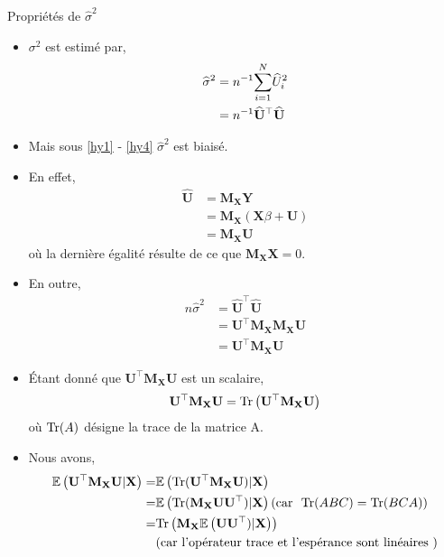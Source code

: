 \begin{frame}[allowframebreaks]{Propriétés de $\widehat{\sigma}^2$}
\begin{itemize}
\item $\sigma^2$ est estimé par,
\begin{align*}
\widehat{\sigma}^2
&= n^{-1}\underset{i=1}{\overset{N}{\sum}} \widehat{U}_i^2\\
& =  n^{-1}\widehat{\mathbf{U}}^\top\widehat{\mathbf{U}}
\end{align*}
\item Mais sous \ref{hy1} - \ref{hy4} $\widehat{\sigma}^2$ est  biaisé. 
\item En effet,
\begin{align*}
\widehat{\mathbf{U}} &= \mathbf{M}_\mathbf{X}\mathbf{Y}\\
& = \mathbf{M}_\mathbf{X}(\mathbf{X}\beta + \mathbf{U})\\
& = \mathbf{M}_\mathbf{X}\mathbf{U}
\end{align*}
où la dernière égalité résulte de ce que $\mathbf{M}_\mathbf{X}\mathbf{X} = 0$. 
\item En outre,
\begin{align*}
n\widehat{\sigma}^2 &= \widehat{\mathbf{U}}^\top\widehat{\mathbf{U}}\\
& = \mathbf{U}^\top\mathbf{M}_\mathbf{X}\mathbf{M}_\mathbf{X}\mathbf{U} \\
&= \mathbf{U}^\top\mathbf{M}_\mathbf{X}\mathbf{U}
\end{align*}
\item \'Etant donné que $\mathbf{U}^\top\mathbf{M}_\mathbf{X}\mathbf{U}$ est un scalaire,
\begin{align*}
\mathbf{U}^\top\mathbf{M}_\mathbf{X}\mathbf{U} = \mathrm{Tr}\left(\mathbf{U}^\top\mathbf{M}_\mathbf{X}\mathbf{U}\right)
\end{align*}
où $\mathrm{Tr}(A)$ désigne la trace de la matrice A.
\item  Nous avons,
\begin{align*}
\Er\left(\mathbf{U}^\top\mathbf{M}_\mathbf{X}\mathbf{U}|\mathbf{X}\right) =&  \Er\left(\Tr(\mathbf{U}^\top\mathbf{M}_\mathbf{X}\mathbf{U})|\mathbf{X}\right)\\
=&\Er\left(\Tr(\mathbf{M}_\mathbf{X}\mathbf{U}\mathbf{U}^\top)|\mathbf{X}\right)(\textrm{car \ } \Tr(ABC) = \Tr(BCA))\\
=&\Tr\left(\mathbf{M}_\mathbf{X}\Er\left(\mathbf{U}\mathbf{U}^\top)|\mathbf{X}\right)\right)\\
&(\textrm{car l'opérateur trace et l'espérance sont linéaires })\\

\end{align*}
\end{itemize}
\end{frame}
